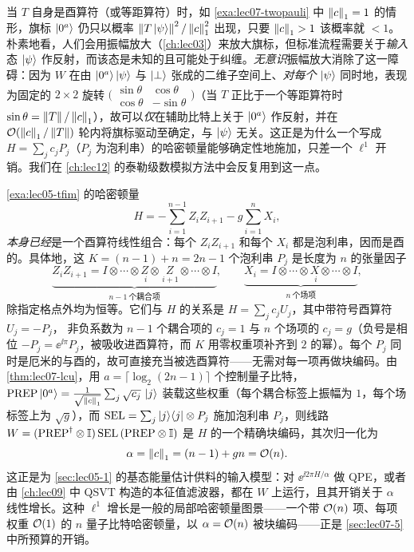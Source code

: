\begin{remark}
\label{rem:lec07-oaa}
当 $T$ 自身是酉算符（或等距算符）时，如 \cref{exa:lec07-twopauli} 中 $\left\lVert c \right\rVert_1=1$ 的情形，旗标 $\ket{0^a}$ 仍只以概率
$\left\lVert T\ket\psi \right\rVert^2/\left\lVert c \right\rVert_1^2$ 出现，只要 $\left\lVert c \right\rVert_1>1$ 该概率就 $<1$。朴素地看，人们会用振幅放大（\cref{ch:lec03}）来放大旗标，但标准流程需要关于\emph{输入}态 $\ket{\psi}$ 作反射，而该态是未知的且可能处于纠缠。\emph{无意识}振幅放大消除了这一障碍：因为 $W$ 在由 $\ket{0^a}\ket\psi$ 与 $\ket\perp$ 张成的二维子空间上、\emph{对每个} $\ket\psi$ 同时地，表现为固定的 $2\times2$ 旋转
$\bigl(\begin{smallmatrix}\sin\theta&\cos\theta\\ \cos\theta&-\sin\theta
\end{smallmatrix}\bigr)$（当 $T$ 正比于一个等距算符时 $\sin\theta=\left\lVert T \right\rVert/\left\lVert c \right\rVert_1$），故可以\emph{仅}在辅助比特上关于 $\ket{0^a}$ 作反射，并在 $\mathcal{O}(\left\lVert c \right\rVert_1/\left\lVert T \right\rVert)$ 轮内将旗标驱动至确定，与 $\ket\psi$ 无关。这正是为什么一个写成 $H=\sum_j c_j P_j$（$P_j$ 为泡利串）的哈密顿量能够确定性地施加，只差一个 $\ell^1$ 开销。我们在 \cref{ch:lec12} 的泰勒级数模拟方法中会反复用到这一点。
\end{remark}

\begin{example}
\label{exa:lec07-tfim}
\cref{exa:lec05-tfim} 的哈密顿量
\[
  H=-\sum_{i=1}^{n-1}Z_iZ_{i+1}-g\sum_{i=1}^{n}X_i,
\]
\emph{本身已经}是一个酉算符线性组合：每个 $Z_iZ_{i+1}$ 和每个
$X_i$ 都是泡利串，因而是酉的。具体地，这 $K=(n-1)+n=2n-1$ 个泡利串 $P_j$ 是长度为 $n$ 的张量因子
\[
  \underbrace{Z_iZ_{i+1}=I\otimes\cdots\otimes\!\!\underset{\;i}{Z}\otimes\underset{\,i+1}{Z}\!\!\otimes\cdots\otimes I}_{n-1\ \text{个耦合项}},
  \qquad
  \underbrace{X_i=I\otimes\cdots\otimes\!\!\underset{\;i}{X}\!\!\otimes\cdots\otimes I}_{n\ \text{个场项}},
\]
除指定格点外均为恒等。它们与 $H$ 的关系是 $H=\sum_j c_j U_j$，其中带符号酉算符 $U_j=-P_j$，
非负系数为 $n-1$ 个耦合项的 $c_j=1$ 与 $n$ 个场项的 $c_j=g$（负号是相位 $-P_j=\ee^{\ii\pi}P_j$，被吸收进酉算符，而 $K$ 用零权重项补齐到 $2$ 的幂）。每个 $P_j$ 同时是厄米的与酉的，故可直接充当被选酉算符——无需对每一项再做块编码。由 \cref{thm:lec07-lcu}，用 $a=\lceil\log_2(2n-1)\rceil$ 个控制量子比特，
$\mathrm{PREP}\ket{0^a}=\tfrac{1}{\sqrt{\left\lVert c \right\rVert_1}}\sum_j\sqrt{c_j}\,\ket{j}$
装载这些权重（每个耦合标签上振幅为 $1$，每个场标签上为 $\sqrt g$），而 $\mathrm{SEL}=\sum_j\ket{j}\!\bra{j}\otimes P_j$ 施加泡利串 $P_j$，则线路 $W=(\mathrm{PREP}^{\dagger}\otimes\mathbb{I})\,\mathrm{SEL}\,(\mathrm{PREP}\otimes\mathbb{I})$
是 $H$ 的一个精确块编码，其次归一化为
\[
  \alpha=\left\lVert c \right\rVert_1=(n-1)+gn=\mathcal{O}(n).
\]
这正是为 \cref{sec:lec05-1} 的基态能量估计供料的输入模型：对 $\ee^{\ii 2\pi H/\alpha}$ 做 QPE，或者由 \cref{ch:lec09} 中 QSVT 构造的本征值滤波器，都在 $W$ 上运行，且其开销关于 $\alpha$ 线性增长。这种 $\ell^1$ 增长是一般的局部哈密顿量图景——一个带 $\mathcal{O}(n)$ 项、每项权重 $\mathcal{O}(1)$ 的 $n$ 量子比特哈密顿量，以 $\alpha=\mathcal{O}(n)$ 被块编码——正是 \cref{sec:lec07-5} 中所预算的开销。
\end{example}
